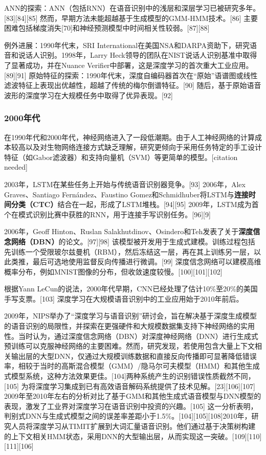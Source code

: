 ANN的探索：ANN（包括RNN）在语音识别中的浅层和深层学习已被研究多年。[83][84][85] 然而，早期方法未能超越基于生成模型的GMM-HMM技术。[86] 主要困难包括梯度消失[70]和神经预测模型中时间相关性较弱。[87][88]  

例外进展：1990年代末，SRI International在美国NSA和DARPA资助下，研究语音和说话人识别。1998年，Larry Heck领导的团队在NIST说话人识别基准中取得了显著成功，并在Nuance Verifier中部署，这是深度学习的首次重大工业应用。[89][91]  原始特征的探索：1990年代末，深度自编码器首次在“原始”语谱图或线性滤波特征上表现出优越性，超越了传统的梅尔倒谱特征。[90] 随后，基于原始语音波形的深度学习在大规模任务中取得了优异表现。[92]  
\subsubsection{2000年代}  
在1990年代和2000年代，神经网络进入了一段低潮期。由于人工神经网络的计算成本较高以及对生物网络连接方式缺乏理解，研究更倾向于采用任务特定的手工设计特征（如Gabor滤波器）和支持向量机（SVM）等更简单的模型。[citation needed]  

2003年，LSTM在某些任务上开始与传统语音识别器竞争。[93] 2006年，Alex Graves、Santiago Fernández、Faustino Gomez和Schmidhuber将LSTM与\textbf{连接时间分类（CTC）}结合在一起，形成了LSTM堆栈。[94][95] 2009年，LSTM成为首个在模式识别比赛中获胜的RNN，用于连接手写识别任务。[96][9]  

2006年，Geoff Hinton、Ruslan Salakhutdinov、Osindero和Teh发表了关于\textbf{深度信念网络（DBN）}的论文。[97][98] 该模型被开发用于生成式建模。训练过程包括先训练一个受限玻尔兹曼机（RBM），然后冻结这一层，再在其上训练另一层，以此类推，最后可选地使用监督反向传播进行微调。[99] 深度信念网络可以建模高维概率分布，例如MNIST图像的分布，但收敛速度较慢。[100][101][102]  

根据Yann LeCun的说法，2000年代早期，CNN已经处理了估计10\%至20\%的美国手写支票。[103] 深度学习在大规模语音识别中的工业应用始于2010年前后。  

2009年，NIPS举办了“深度学习与语音识别”研讨会，旨在解决基于深度生成模型的语音识别的局限性，并探索在更强硬件和大规模数据集支持下神经网络的实用性。当时认为，通过深度信念网络（DBN）对深度神经网络（DNN）进行生成式预训练可以克服神经网络的主要困难。然而，研究发现，若使用包含大量上下文相关输出层的大型DNN，仅通过大规模训练数据和直接反向传播即可显著降低错误率，相较于当时的高斯混合模型（GMM）/隐马尔可夫模型（HMM）和其他生成式模型系统，这种方法效果更佳。[104]两种系统产生的识别错误性质截然不同，[105] 为将深度学习集成到已有高效语音解码系统提供了技术见解。[23][106][107] 2009年至2010年左右的分析对比了基于GMM和其他生成式语音模型与DNN模型的表现，激发了工业界对深度学习在语音识别中投资的兴趣。[105] 这一分析表明，判别式DNN与生成式模型之间的误差率差距小于1.5\%。[104][105][108]2010年，研究人员将深度学习从TIMIT扩展到大词汇量语音识别。他们通过基于决策树构建的上下文相关HMM状态，采用DNN的大型输出层，从而实现这一突破。[109][110][111][106]  
